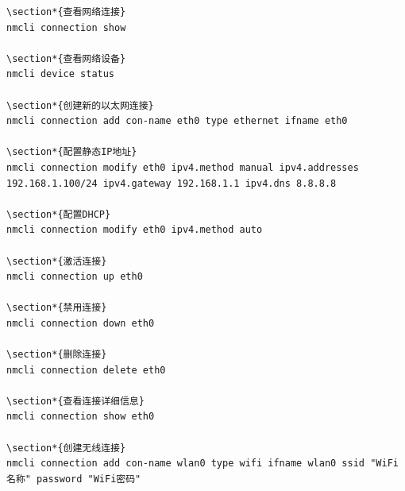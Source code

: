 \documentclass[12pt,UTF8]{ctexbook}
\begin{document}
\begin{verbatim}
\section*{查看网络连接}
nmcli connection show

\section*{查看网络设备}
nmcli device status

\section*{创建新的以太网连接}
nmcli connection add con-name eth0 type ethernet ifname eth0

\section*{配置静态IP地址}
nmcli connection modify eth0 ipv4.method manual ipv4.addresses 192.168.1.100/24 ipv4.gateway 192.168.1.1 ipv4.dns 8.8.8.8

\section*{配置DHCP}
nmcli connection modify eth0 ipv4.method auto

\section*{激活连接}
nmcli connection up eth0

\section*{禁用连接}
nmcli connection down eth0

\section*{删除连接}
nmcli connection delete eth0

\section*{查看连接详细信息}
nmcli connection show eth0

\section*{创建无线连接}
nmcli connection add con-name wlan0 type wifi ifname wlan0 ssid "WiFi名称" password "WiFi密码"


\end{verbatim}
\end{document}
